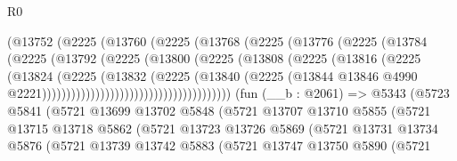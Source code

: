 \begin{lexlean}{R0}
\begin{coremodule}
                                (@13752
                                  (@2225
                                    (@13760
                                      (@2225
                                        (@13768
                                          (@2225
                                            (@13776
                                              (@2225
                                                (@13784
                                                  (@2225
                                                    (@13792
                                                      (@2225
                                                        (@13800
                                                          (@2225
                                                            (@13808
                                                              (@2225
                                                                (@13816
                                                                  (@2225
                                                                    (@13824
                                                                      (@2225
                                                                        (@13832
                                                                          (@2225
                                                                            (@13840
                                                                              (@2225
                                                                                (@13844
                                                                                  @13846
                                                                                  @4990
                                                                                  @2221)))))))))))))))))))))))))))))))))))))))
    (fun (__b : @2061) =>
    @5343
      (@5723
        @5841
        (@5721
          @13699
          @13702
          @5848
          (@5721
            @13707
            @13710
            @5855
            (@5721
              @13715
              @13718
              @5862
              (@5721
                @13723
                @13726
                @5869
                (@5721
                  @13731
                  @13734
                  @5876
                  (@5721
                    @13739
                    @13742
                    @5883
                    (@5721
                      @13747
                      @13750
                      @5890
                      (@5721

\end{coremodule}
\end{lexlean}
